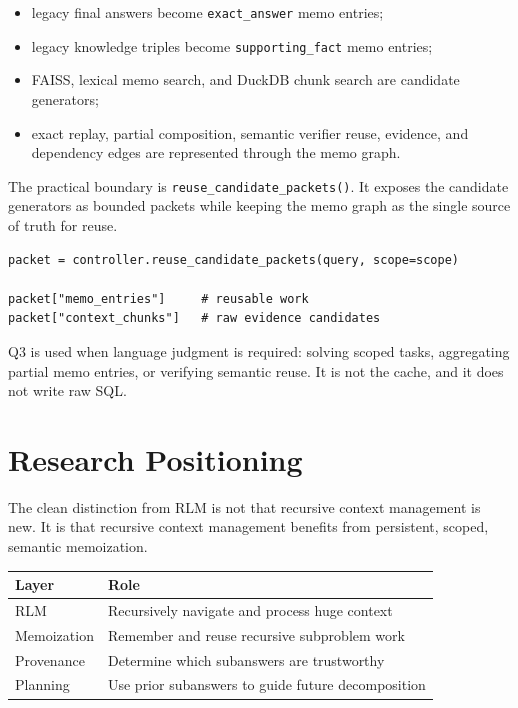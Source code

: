 \documentclass[11pt]{article}
\begin{document}
\begin{itemize}[leftmargin=*]
    \item legacy final answers become \texttt{exact\_answer} memo entries;
    \item legacy knowledge triples become \texttt{supporting\_fact} memo entries;
    \item FAISS, lexical memo search, and DuckDB chunk search are candidate
    generators;
    \item exact replay, partial composition, semantic verifier reuse, evidence,
    and dependency edges are represented through the memo graph.
\end{itemize}

The practical boundary is \texttt{reuse\_candidate\_packets()}. It exposes the
candidate generators as bounded packets while keeping the memo graph as the
single source of truth for reuse.

\begin{verbatim}
packet = controller.reuse_candidate_packets(query, scope=scope)

packet["memo_entries"]     # reusable work
packet["context_chunks"]   # raw evidence candidates
\end{verbatim}

Q3 is used when language judgment is required: solving scoped tasks,
aggregating partial memo entries, or verifying semantic reuse. It is not the
cache, and it does not write raw SQL.

\section{Research Positioning}

The clean distinction from RLM is not that recursive context management is
new. It is that recursive context management benefits from persistent, scoped,
semantic memoization.

\begin{center}
\begin{tabular}{ll}
\toprule
\textbf{Layer} & \textbf{Role} \\
\midrule
RLM & Recursively navigate and process huge context \\
Memoization & Remember and reuse recursive subproblem work \\
Provenance & Determine which subanswers are trustworthy \\
Planning & Use prior subanswers to guide future decomposition \\
\bottomrule
\end{tabular}
\end{center}
\end{document}
